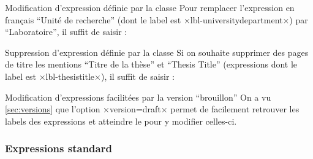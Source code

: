 \begin{table}
  \centering
  
  \caption{Expressions de la \yatcl (classées par ordre
    alphabétique de leurs valeurs en français) et labels correspondants}
  \label{tab:expressions-cles}
\end{table}

\begin{dbexample}{Modification d'expression définie par la classe}{}
  Pour remplacer l'expression en français \enquote{Unit\'e de recherche} (dont le label est
  ×lbl-universitydepartment×) par \enquote{Laboratoire}, il suffit de
  saisir :
\begin{preamblecode}[title=Par exemple dans le \File{\configurationfile}]
\end{preamblecode}
\end{dbexample}
%
\begin{dbexample}{Suppression d'expression définie par la classe}{}
  Si on souhaite supprimer des pages de titre les mentions \enquote{Titre de la
    thèse} et \foreignquote{english}{Thesis Title} (expressions dont le label
  est ×lbl-thesistitle×), il suffit de saisir :
\begin{preamblecode}[title=Par exemple dans le \File{\configurationfile}]
\end{preamblecode}
\end{dbexample}

\begin{dbremark}{Modification d'expressions facilitées par la version
    \enquote{brouillon}}{}
  On a vu \vref{sec:versions} que l'option ×version=draft× permet de facilement
  retrouver les labels des expressions et atteindre le \File{\configurationfile}
  pour y modifier celles-ci.
\end{dbremark}

\subsubsection{Expressions standard}
\label{sec:expressions-standard}

